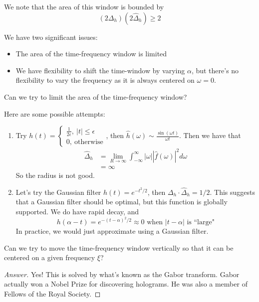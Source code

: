 \documentclass{article}
\begin{document}
We note that the area of this window is bounded by
\[(2 \Delta_h)(2 \widehat{\Delta}_h) \geq 2\]

We have two significant issues:
\begin{itemize}
    \item The area of the time-frequency window is limited
    \item We have flexibility to shift the time-window by varying $\alpha$, but there's no flexibility to vary the frequency as it is always centered on $\omega = 0$.
\end{itemize}

\begin{question}
    Can we try to limit the area of the time-frequency window?
\end{question}

\begin{example}
    Here are some possible attempts:
    \begin{enumerate}
        \item Try $h(t) = \begin{cases} 
        \frac{1}{2\epsilon},\ |t| \leq \epsilon\\
        0,\ \text{otherwise}
        \end{cases}$, then $\widehat{h}(\omega) \sim \frac{\sin(\omega t)}{\omega t}$. Then we have that
        \begin{align*}
            \widehat{\Delta}_h &= \lim_{R \to \infty} \int_{-\infty}^\infty |\omega| |\widehat{f}(\omega)|^2 d\omega\\
            &= \infty
        \end{align*}
        So the radius is not good.
        \item Let's try the Gaussian filter $h(t) = e^{-t^2/2}$, then $\Delta_h \cdot \widehat{\Delta}_h = 1/2$. This suggests that a Gaussian filter should be optimal, but this function is globally supported. We do have rapid decay, and
        \[h(\alpha - t) = e^{-(t-\alpha)^2/2} \approx 0 \text{ when $|t - \alpha|$ is ``large"}\]
        In practice, we would just approximate using a Gaussian filter.
    \end{enumerate}
\end{example}

\begin{question}
    Can we try to move the time-frequency window vertically so that it can be centered on a given frequency $\xi$?
\end{question}

\begin{proof}[Answer]
    Yes! This is solved by what's known as the Gabor transform. Gabor actually won a Nobel Prize for discovering holograms. He was also a member of Fellows of the Royal Society.
\end{proof}
\end{document}
